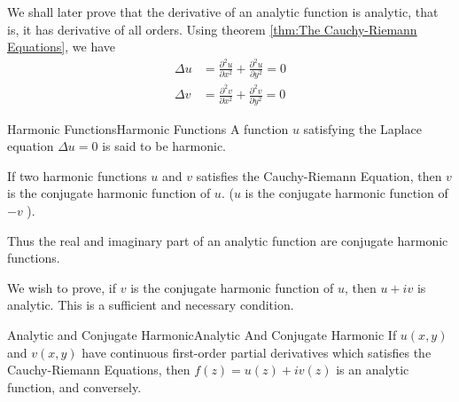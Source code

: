 \documentclass[../main.tex]{subfiles}
\begin{document}
We shall later prove that the derivative of an analytic function is analytic, that is, it has derivative of all orders. Using theorem \ref{thm:The Cauchy-Riemann Equations}, we have
\begin{equation}
\begin{aligned}
	\Delta u &= \frac{\partial ^2 u}{\partial x^2} + \frac{\partial ^2u}{\partial y^2} = 0\\
	\Delta v &= \frac{\partial ^2v}{\partial x^2} + \frac{\partial ^2v}{\partial y^2} = 0
\end{aligned}
\end{equation}

\begin{definition}{Harmonic Functions}{Harmonic Functions}
A function $u$ satisfying the Laplace equation $\Delta u =0 $ is said to be harmonic. 

If two harmonic functions $u$ and $v$ satisfies the Cauchy-Riemann Equation, then $v$ is the conjugate harmonic function of $u$. ($u$ is the conjugate harmonic function of $-v$ ).
\end{definition}
Thus the real and imaginary part of an analytic function are conjugate harmonic functions.

We wish to prove, if $v$ is the conjugate harmonic function of $u$, then $u+iv$ is analytic. This is a sufficient and necessary condition.
\begin{theorem}{Analytic and Conjugate Harmonic}{Analytic And Conjugate Harmonic}
If $u(x,y)$ and $v(x,y)$ have continuous first-order partial derivatives which satisfies the Cauchy-Riemann Equations, then $f(z) = u(z)+iv(z)$ is an analytic function, and conversely.
\end{theorem}
\end{document}
